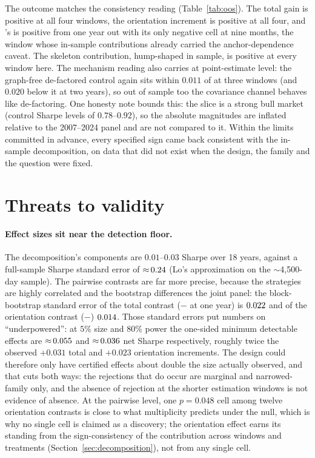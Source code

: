 The outcome matches the consistency reading
(Table~\ref{tab:oos}). The total gain is positive at all four windows,
the \skelsem{} orientation increment is positive at all four, and
\orientsem{}'s is positive from one year out with its only negative
cell at nine months, the window whose in-sample contributions already
carried the anchor-dependence caveat. The skeleton contribution,
hump-shaped in sample, is positive at every window here. The mechanism
reading also carries at point-estimate level: the graph-free
de-factored control again sits within $0.011$ of \skelsem{} at three
windows (and $0.020$ below it at two years), so out of sample too the
covariance channel behaves like de-factoring. One honesty note bounds
this: the slice is a strong bull market (control Sharpe levels of
$0.78$--$0.92$), so the absolute magnitudes are inflated relative to
the 2007--2024 panel and are not compared to it. Within the limits
committed in advance, every specified sign
came back consistent with the in-sample decomposition, on data that did
not exist when the design, the family and the question were fixed.

\section{Threats to validity}
\label{sec:believe}

\paragraph{Effect sizes sit near the detection floor.} The decomposition's
components are $0.01$--$0.03$ Sharpe over 18 years, against a full-sample
Sharpe standard error of ${\approx}\,0.24$ (Lo's
approximation on the $\sim$4{,}500-day sample). The pairwise contrasts
are far more precise, because the strategies are highly
correlated and the bootstrap differences the joint panel: the
block-bootstrap standard error of the total contrast
(\skelsem{}$-$\HRP{} at one year) is $0.022$ and of the
orientation contrast (\orientsem{}$-$\skelsamp{}) $0.014$.
Those standard errors put numbers on ``underpowered'': at $5\%$ size and
$80\%$ power the one-sided minimum detectable effects are
${\approx}\,0.055$ and ${\approx}\,0.036$
net Sharpe respectively, roughly twice the observed $+0.031$ total and
$+0.023$ orientation increments. The design could therefore only have
certified effects about double the size actually observed, and that cuts
both ways: the
rejections that do occur are marginal and narrowed-family only, and the
absence of rejection at
the shorter estimation windows is not evidence of absence. At the pairwise level, one
$p=0.048$ cell among twelve orientation contrasts is close to what
multiplicity predicts under the null, which is why no single cell is
claimed as a discovery; the orientation effect earns its standing from
the sign-consistency of the contribution across windows and treatments
(Section~\ref{sec:decomposition}), not from any single cell.

